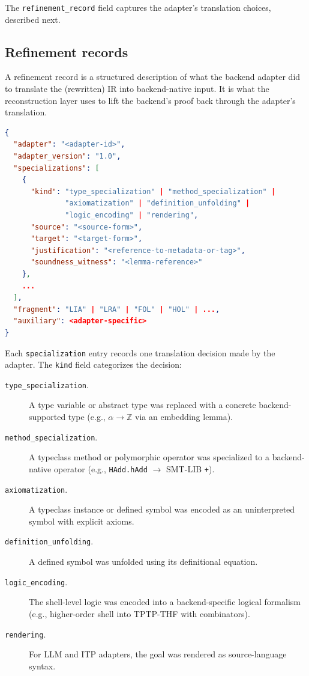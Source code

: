 \documentclass[11pt,letterpaper]{article}
\theoremstyle{definition}
\theoremstyle{remark}
\begin{document}
The \texttt{refinement\_record} field captures the adapter's
translation choices, described next.

\subsection{Refinement records}
\label{sec:refinement-records}

A refinement record is a structured description of what the backend
adapter did to translate the (rewritten) IR into backend-native input.
It is what the reconstruction layer uses to lift the backend's proof
back through the adapter's translation.

\begin{lstlisting}[language=json]
{
  "adapter": "<adapter-id>",
  "adapter_version": "1.0",
  "specializations": [
    {
      "kind": "type_specialization" | "method_specialization" |
              "axiomatization" | "definition_unfolding" |
              "logic_encoding" | "rendering",
      "source": "<source-form>",
      "target": "<target-form>",
      "justification": "<reference-to-metadata-or-tag>",
      "soundness_witness": "<lemma-reference>"
    },
    ...
  ],
  "fragment": "LIA" | "LRA" | "FOL" | "HOL" | ...,
  "auxiliary": <adapter-specific>
}
\end{lstlisting}

Each \texttt{specialization} entry records one translation decision made
by the adapter. The \texttt{kind} field categorizes the decision:

\begin{description}
  \item[\texttt{type\_specialization}.] A type variable or abstract type
        was replaced with a concrete backend-supported type
        (e.g., $\alpha \to \mathbb{Z}$ via an embedding lemma).
  \item[\texttt{method\_specialization}.] A typeclass method or
        polymorphic operator was specialized to a backend-native
        operator (e.g., \texttt{HAdd.hAdd} $\to$ SMT-LIB \texttt{+}).
  \item[\texttt{axiomatization}.] A typeclass instance or defined symbol
        was encoded as an uninterpreted symbol with explicit axioms.
  \item[\texttt{definition\_unfolding}.] A defined symbol was unfolded
        using its definitional equation.
  \item[\texttt{logic\_encoding}.] The shell-level logic was encoded
        into a backend-specific logical formalism (e.g., higher-order
        shell into TPTP-THF with combinators).
  \item[\texttt{rendering}.] For LLM and ITP adapters, the goal was
        rendered as source-language syntax.
\end{description}
\end{document}
